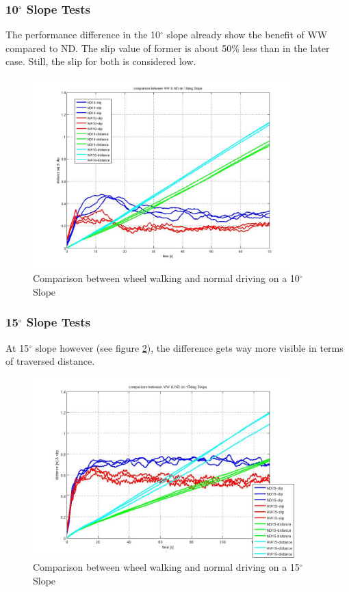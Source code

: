 \documentclass[a4paper,twocolumn]{esapub2005} %
\begin{document}
\subsubsection*{10$^{\circ}$ Slope Tests}
The performance difference in the 10$^\circ$ slope already show the benefit of
WW compared to ND. The slip value of former is about 50\% less than in the
later case. Still, the slip for both is considered low.

\begin{figure}[h!]
    \centering
    \includegraphics[width=0.9\textwidth]{10d.jpg}	\caption{Comparison between
    wheel walking and normal driving on a 10$^{\circ}$ Slope} \label{fig:10d}
\end{figure}

\subsubsection*{15$^{\circ}$ Slope Tests}
At 15$^\circ$ slope however (see figure \ref{fig:15d}), the difference gets way
more visible in terms of traversed distance.  

\begin{figure}[h!]
    \centering
    \includegraphics[width=0.9\textwidth]{15d.jpg}	\caption{Comparison between
    wheel walking and normal driving on a 15$^{\circ}$ Slope} \label{fig:15d}
\end{figure}
\end{document}
